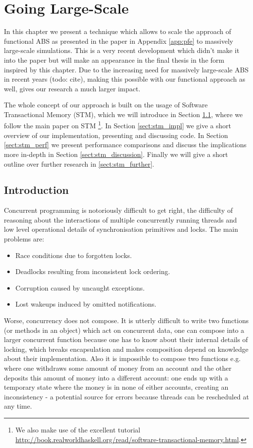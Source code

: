 \chapter{Going Large-Scale}
\label{chap:stm}

In this chapter we present a technique which allows to scale the approach of functional ABS as presented in the paper in Appendix \ref{app:pfe} to massively large-scale simulations. This is a very recent development which didn't make it into the paper but will make an appearance in the final thesis in the form inspired by this chapter. Due to the increasing need for massively large-scale ABS in recent years (todo: cite), making this possible with our functional approach as well, gives our research a much larger impact.

The whole concept of our approach is built on the usage of Software Transactional Memory (STM), which we will introduce in Section \ref{sect:stm_intro}, where we follow the main paper \cite{harris_composable_2005} on STM \footnote{We also make use of the excellent tutorial \url{http://book.realworldhaskell.org/read/software-transactional-memory.html}.}. In Section \ref{sect:stm_impl} we give a short overview of our implementation, presenting and discussing code. In Section \ref{sect:stm_perf} we present performance comparisons and discuss the implications more in-depth in Section \ref{sect:stm_discussion}. Finally we will give a short outline over further research in \ref{sect:stm_further}.

\section{Introduction}
\label{sect:stm_intro}
Concurrent programming is notoriously difficult to get right, the difficulty of reasoning about the interactions of multiple concurrently running threads and low level operational details of synchronisation primitives and locks. The main problems are:

\begin{itemize}
	\item Race conditions due to forgotten locks.
	\item Deadlocks resulting from inconsistent lock ordering.
	\item Corruption caused by uncaught exceptions.
	\item Lost wakeups induced by omitted notifications.
\end{itemize}

Worse, concurrency does not compose. It is utterly difficult to write two functions (or methods in an object) which act on concurrent data, one can compose into a larger concurrent function because one has to know about their internal details of locking, which breaks encapsulation and makes composition depend on knowledge about their implementation. Also it is impossible to compose two functions e.g. where one withdraws some amount of money from an account and the other deposits this amount of money into a different account: one ends up with a temporary state where the money is in none of either accounts, creating an inconsistency - a potential source for errors because threads can be rescheduled at any time.


